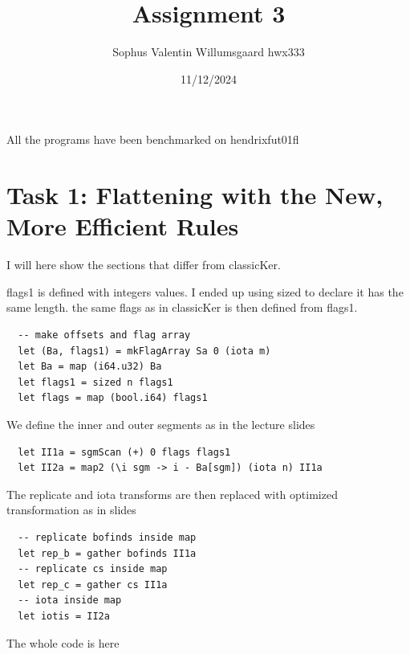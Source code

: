 \documentclass[a4paper,12pt]{article}
\begin{document}
\title{Assignment 3}
\author{Sophus Valentin Willumsgaard hwx333}
\date{11/12/2024}
\maketitle

All the programs have been benchmarked on hendrixfut01fl
\section*{Task 1:
  Flattening with the New, More Efficient Rules}
I will here show the sections that differ from classicKer.

flags1 is defined with integers values. I ended up using sized to declare it
has the same length. the same flags as in classicKer is then defined from
flags1.
\begin{lstlisting}
  -- make offsets and flag array
  let (Ba, flags1) = mkFlagArray Sa 0 (iota m)
  let Ba = map (i64.u32) Ba
  let flags1 = sized n flags1
  let flags = map (bool.i64) flags1
\end{lstlisting}
We define the inner and outer segments as in the lecture slides
\begin{lstlisting}
  let II1a = sgmScan (+) 0 flags flags1
  let II2a = map2 (\i sgm -> i - Ba[sgm]) (iota n) II1a
\end{lstlisting}
The replicate and iota transforms are then replaced with optimized
transformation as in slides
\begin{lstlisting}
  -- replicate bofinds inside map
  let rep_b = gather bofinds II1a
  -- replicate cs inside map
  let rep_c = gather cs II1a
  -- iota inside map
  let iotis = II2a
\end{lstlisting}
The whole code is here
\end{document}
